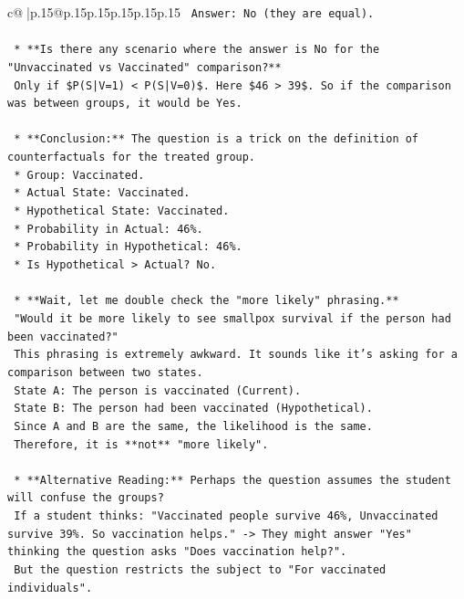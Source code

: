 \documentclass{article}
\begin{document}
{\begin{supertabular}{c@{$\;$}|p{.15\linewidth}@{}p{.15\linewidth}p{.15\linewidth}p{.15\linewidth}p{.15\linewidth}p{.15\linewidth}}
{{{\texttt{        Answer: No (they are equal).} \\
\\ 
\texttt{    *   **Is there any scenario where the answer is No for the "Unvaccinated vs Vaccinated" comparison?**} \\
\texttt{        Only if \$P(S|V=1) < P(S|V=0)\$. Here \$46 > 39\$. So if the comparison was between groups, it would be Yes.} \\
\\ 
\texttt{    *   **Conclusion:** The question is a trick on the definition of counterfactuals for the treated group.} \\
\texttt{        *   Group: Vaccinated.} \\
\texttt{        *   Actual State: Vaccinated.} \\
\texttt{        *   Hypothetical State: Vaccinated.} \\
\texttt{        *   Probability in Actual: 46\%.} \\
\texttt{        *   Probability in Hypothetical: 46\%.} \\
\texttt{        *   Is Hypothetical > Actual? No.} \\
\\ 
\texttt{    *   **Wait, let me double check the "more likely" phrasing.**} \\
\texttt{        "Would it be more likely to see smallpox survival if the person had been vaccinated?"} \\
\texttt{        This phrasing is extremely awkward. It sounds like it's asking for a comparison between two states.} \\
\texttt{        State A: The person is vaccinated (Current).} \\
\texttt{        State B: The person had been vaccinated (Hypothetical).} \\
\texttt{        Since A and B are the same, the likelihood is the same.} \\
\texttt{        Therefore, it is **not** "more likely".} \\
\\ 
\texttt{    *   **Alternative Reading:** Perhaps the question assumes the student will confuse the groups?} \\
\texttt{        If a student thinks: "Vaccinated people survive 46\%, Unvaccinated survive 39\%. So vaccination helps." {-}> They might answer "Yes" thinking the question asks "Does vaccination help?".} \\
\texttt{        But the question restricts the subject to "For vaccinated individuals".} \\
}}}
\end{supertabular}}
\end{document}
